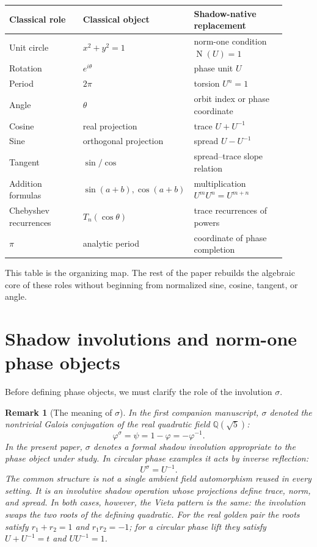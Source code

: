 \documentclass[11pt]{article}
\newtheorem{remark}[definition]{Remark}
\newcommand{\Nm}{\operatorname{N}}
\newcommand{\ph}{\varphi}
\newcommand{\ps}{\psi}
\newcommand{\sig}{\sigma}
\newcommand{\Q}{\mathbb{Q}}
\begin{document}
\begin{center}
\begin{tabular}{p{0.28\linewidth}p{0.27\linewidth}p{0.35\linewidth}}
\toprule
Classical role & Classical object & Shadow-native replacement \\
\midrule
Unit circle & $x^2+y^2=1$ & norm-one condition $\Nm(U)=1$ \\
Rotation & $e^{i\theta}$ & phase unit $U$ \\
Period & $2\pi$ & torsion $U^n=1$ \\
Angle & $\theta$ & orbit index or phase coordinate \\
Cosine & real projection & trace $U+U^{-1}$ \\
Sine & orthogonal projection & spread $U-U^{-1}$ \\
Tangent & $\sin/\cos$ & spread--trace slope relation \\
Addition formulas & $\sin(a+b),\cos(a+b)$ & multiplication $U^mU^n=U^{m+n}$ \\
Chebyshev recurrences & $T_n(\cos\theta)$ & trace recurrences of powers \\
$\pi$ & analytic period & coordinate of phase completion \\
\bottomrule
\end{tabular}
\end{center}

This table is the organizing map.  The rest of the paper rebuilds the algebraic core of these roles without beginning from normalized sine, cosine, tangent, or angle.

\section{Shadow involutions and norm-one phase objects}

Before defining phase objects, we must clarify the role of the involution $\sig$.

\begin{remark}[The meaning of $\sig$]
In the first companion manuscript, $\sig$ denoted the nontrivial Galois conjugation of the real quadratic field $\Q(\sqrt5)$:
\[
    \ph^\sig=\ps=1-\ph=-\ph^{-1}.
\]
In the present paper, $\sig$ denotes a formal shadow involution appropriate to the phase object under study.  In circular phase examples it acts by inverse reflection:
\[
    U^\sig=U^{-1}.
\]
The common structure is not a single ambient field automorphism reused in every setting.  It is an involutive shadow operation whose projections define trace, norm, and spread.  In both cases, however, the Vieta pattern is the same: the involution swaps the two roots of the defining quadratic.  For the real golden pair the roots satisfy $r_1+r_2=1$ and $r_1r_2=-1$; for a circular phase lift they satisfy $U+U^{-1}=t$ and $UU^{-1}=1$.
\end{remark}
\end{document}
